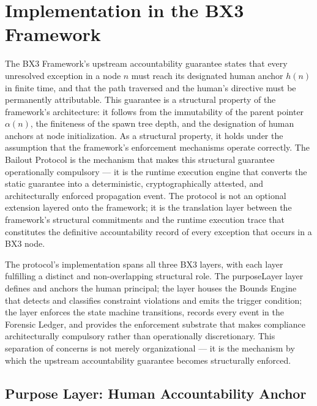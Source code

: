 \section{Implementation in the BX3 Framework}
\label{sec:bailout-implementation}

The BX3 Framework's upstream accountability guarantee states that every
unresolved exception in a node $n$ must reach its designated human anchor
$h(n)$ in finite time, and that the path traversed and the human's directive
must be permanently attributable.  This guarantee is a structural property of
the framework's architecture: it follows from the immutability of the parent
pointer $\alpha(n)$, the finiteness of the spawn tree depth, and the
designation of human anchors at node initialization.  As a structural
property, it holds under the assumption that the framework's enforcement
mechanisms operate correctly.  The Bailout Protocol is the mechanism that
makes this structural guarantee operationally compulsory --- it is the runtime
execution engine that converts the static guarantee into a deterministic,
cryptographically attested, and architecturally enforced propagation event.
The protocol is not an optional extension layered onto the framework; it is
the translation layer between the framework's structural commitments and the
runtime execution trace that constitutes the definitive accountability record
of every exception that occurs in a BX3 node.

The protocol's implementation spans all three BX3 layers, with each layer
fulfilling a distinct and non-overlapping structural role.  The
purposeLayer{} layer defines and anchors the human principal; the \boundsLayer{}
layer houses the Bounds Engine that detects and classifies constraint
violations and emits the trigger condition; the \factLayer{} layer enforces the
state machine transitions, records every event in the Forensic Ledger, and
provides the enforcement substrate that makes compliance architecturally
compulsory rather than operationally discretionary.  This separation of
concerns is not merely organizational --- it is the mechanism by which the
upstream accountability guarantee becomes structurally enforced.

\subsection{Purpose Layer: Human Accountability Anchor}
\label{sec:bailout-purpose-layer}

